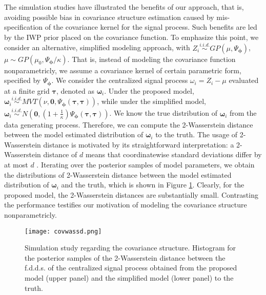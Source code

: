 The simulation studies have illustrated the benefits of our approach, that is, avoiding 
possible bias in covariance structure estimation caused by mis-specification of the covariance 
kernel for the signal process. Such benefits are led by the IWP prior placed on the covariance 
function. To emphasize this point, we consider an alternative, simplified modeling approach, with $Z_i\stackrel{i.i.d.}{\sim}GP(\mu,\Psi_{\boldsymbol{\phi}})$, $\mu\sim GP(\mu_0,\Psi_{\boldsymbol{\phi}}/\kappa)$. That is, instead of modeling the covariance function nonparametricly, we assume a covariance kernel of certain parametric form, specified by $\Psi_{\boldsymbol{\phi}}$. We consider the centralized signal process $\omega_i=Z_i-\mu$ evaluated at a finite grid $\boldsymbol{\tau}$, denoted as $\boldsymbol{\omega}_i$. Under the proposed model, $\boldsymbol{\omega}_i\stackrel{i.i.d.}{\sim}MVT(\nu,\mathbf{0},\Psi_{\boldsymbol{\phi}}(\boldsymbol{\tau},\boldsymbol{\tau}))$, while under the simplified model, $\boldsymbol{\omega}_i\stackrel{i.i.d.}{\sim} N(\mathbf{0},(1+\frac{1}{\kappa})\Psi_{\boldsymbol{\phi}}(\boldsymbol{\tau},\boldsymbol{\tau}))$. We know the true distribution of $\boldsymbol{\omega}_i$ from the data generating process. Therefore, we can compute the 2-Wasserstein distance between the model estimated distribution of $\boldsymbol{\omega}_i$ to the truth. The usage of 2-Wasserstein distance is motivated by its straightforward interpretation: a 2-Wasserstein distance of $d$ means that coordinatewise standard deviations differ by at most $d$ \citep[Thm.~3.4]{Huggins2020}. Iterating over the posterior samples of model parameters, we obtain the distributions of 2-Wasserstein distance between the model estimated distribution of $\boldsymbol{\omega}_i$ and the truth, which is shown in Figure \ref{fig:covwassd}. Clearly, for the proposed model, the 2-Wasserstein distances are substantially small. Contrasting the performance testifies our motivation of modeling the covariance structure nonparametricly.

\begin{figure}[t!]
\centering
\texttt{[image: covwassd.png]}
\caption{Simulation study regarding the covariance structure. Histogram for the posterior samples of the 2-Wasserstein distance between the f.d.d.s. of the centralized signal process obtained from the proposed model (upper panel) and the simplified model (lower panel) to the truth.}
\label{fig:covwassd}
\end{figure}



